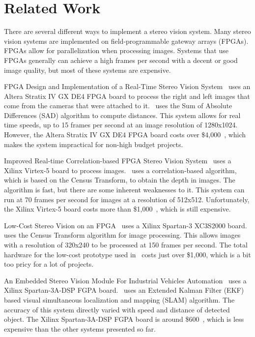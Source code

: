 \chapter{Related Work}

There are several different ways to implement a stereo vision system. Many stereo vision systems are implemented on field-programmable gateway arrays (FPGAs). FPGAs allow for parallelization when processing images. Systems that use FPGAs generally can achieve a high frames per second with a decent or good image quality, but most of these systems are expensive. 

FPGA Design and Implementation of a Real-Time Stereo Vision System~\cite{alteraStratixIVPaper} uses an Altera Stratix IV GX DE4 FPGA board to process the right and left images that come from the cameras that were attached to it.~\cite{alteraStratixIVPaper} uses the Sum of Absolute Differences (SAD) algorithm to compute distances. This system allows for real time speeds, up to 15 frames per second at an image resolution of 1280x1024. However, the Altera Stratix IV GX DE4 FPGA board costs over \$4,000~\cite{alteraStratixIVBoard}, which makes the system impractical for non-high budget projects.

Improved Real-time Correlation-based FPGA Stereo Vision System~\cite{xilinxVirtex5Paper} uses a Xilinx Virtex-5 board to process images.~\cite{xilinxVirtex5Paper} uses a correlation-based algorithm, which is based on the Census Transform, to obtain the depth in images. The algorithm is fast, but there are some inherent weaknesses to it. This system can run at 70 frames per second for images at a resolution of 512x512. Unfortunately, the Xilinx Virtex-5 board costs more than \$1,000~\cite{xilinxVirtex5Board}, which is still expensive.

Low-Cost Stereo Vision on an FPGA~\cite{lowCost1000} uses a Xilinx Spartan-3 XC3S2000 board.~\cite{lowCost1000} uses the Census Transform algorithm for image processing. This allows images with a resolution of 320x240 to be processed at 150 frames per second. The total hardware for the low-cost prototype used in~\cite{lowCost1000} costs just over \$1,000, which is a bit too pricy for a lot of projects.

An Embedded Stereo Vision Module For Industrial Vehicles Automation~\cite{xilinxSpartan3APaper} uses a Xilinx Spartan-3A-DSP FGPA board.~\cite{xilinxSpartan3APaper} uses an Extended Kalman Filter (EKF) based visual simultaneous localization and mapping (SLAM) algorithm. The accuracy of this system directly varied with speed and distance of detected object. The Xilinx Spartan-3A-DSP FGPA board is around \$600~\cite{xilinxSpartan3ABoard}, which is less expensive than the other systems presented so far.

